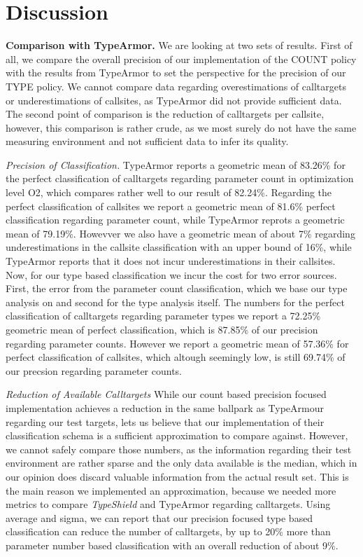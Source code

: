 \section{Discussion}
\label{chapter:Discussion}

\textbf{Comparison with TypeArmor.}
\label{section:comptype}
We are looking at two sets of results. First of all, we compare the overall precision of our implementation
of the COUNT policy with the results from TypeArmor to set the perspective for the precision of our TYPE 
policy. We cannot compare data regarding overestimations of calltargets or underestimations of callsites, 
as TypeArmor did not provide sufficient data. The second point of comparison is the reduction of calltargets
per callsite, however, this comparison is rather crude, as we most surely do not have the same measuring
environment and not sufficient data to infer its quality.

\textit{Precision of Classification.}
TypeArmor reports a geometric mean of 83.26\% for the perfect classification of calltargets regarding 
parameter count in optimization level O2, which compares rather well to our result of 82.24\%. Regarding
the perfect classification of callsites we report a geometric mean of 81.6\% perfect classification 
regarding parameter count, while TypeArmor reprots a geometric mean of 79.19\%. Howevver we also have
a geometric mean of about 7\% regarding underestimations in the callsite classification with an upper
bound of 16\%, while TypeArmor reports that it does not incur underestimations in their callsites.
Now, for our type based classification we incur the cost for two error sources. First, the error from
the parameter count classification, which we base our type analysis on and second for the type analysis
itself. The numbers for the perfect classification of calltargets regarding parameter types we report a
72.25\% geometric mean of perfect classification, which is 87.85\% of our precision regarding parameter
counts. However we report a geometric mean of 57.36\%
for perfect classification of callsites, which altough seemingly low, is still 69.74\% of our precsion
regarding parameter counts.

\textit{Reduction of Available Calltargets}
While our count based precision focused implementation achieves a reduction in the same ballpark as
TypeArmour regarding our test targets, lets us believe that our implementation of their classification
schema is a sufficient approximation to compare against. However, we cannot safely compare those numbers,
as the information regarding their test environment are rather sparse and the only data available is the
median, which in our opinion does discard valuable information from the actual result set. This is the
main reason we implemented an approximation, because we needed more metrics to compare \textit{TypeShield}
and TypeArmor regarding calltargets. Using average and sigma, we can report that our precision focused
type based classification can reduce the number of calltargets, by up to 20\% more than parameter number
based classification with an overall reduction of about 9\%.


